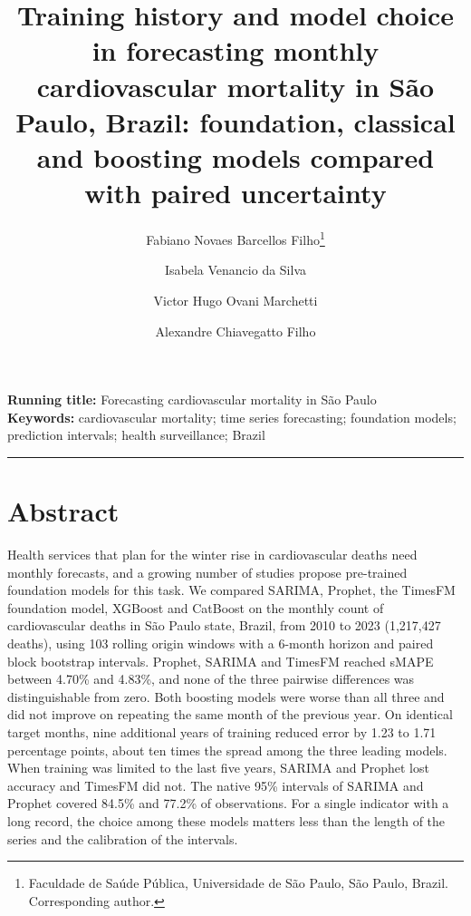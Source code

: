 

\title{\vspace{-2em}\large\bfseries Training history and model choice in forecasting monthly
cardiovascular mortality in S\~ao Paulo, Brazil: foundation, classical and boosting models
compared with paired uncertainty}

\ifdefined\BLIND
\author{}
\else
\author{Fabiano Novaes Barcellos Filho\thanks{Faculdade de Sa\'ude P\'ublica, Universidade de
S\~ao Paulo, S\~ao Paulo, Brazil. Corresponding author.} \and
Isabela Venancio da Silva\footnotemark[1] \and
Victor Hugo Ovani Marchetti\footnotemark[1] \and
Alexandre Chiavegatto Filho\footnotemark[1]}
\fi

\date{}


\maketitle

\noindent\textbf{Running title:} Forecasting cardiovascular mortality in S\~ao Paulo \\
\textbf{Keywords:} cardiovascular mortality; time series forecasting; foundation models;
prediction intervals; health surveillance; Brazil

\vspace{1em}
\hrule
\vspace{1em}

\section*{Abstract}

Health services that plan for the winter rise in cardiovascular deaths need monthly
forecasts, and a growing number of studies propose pre-trained foundation models for this
task. We compared SARIMA, Prophet, the TimesFM foundation model, XGBoost and CatBoost on the
monthly count of cardiovascular deaths in S\~ao Paulo state, Brazil, from 2010 to 2023
(1{,}217{,}427 deaths), using 103 rolling origin windows with a 6-month horizon and paired
block bootstrap intervals. Prophet, SARIMA and TimesFM reached sMAPE between 4.70\% and
4.83\%, and none of the three pairwise differences was distinguishable from zero. Both
boosting models were worse than all three and did not improve on repeating the same month
of the previous year. On identical target months, nine additional years of training reduced
error by 1.23 to 1.71 percentage points, about ten times the spread among the three leading
models. When training was limited to the last five years, SARIMA and Prophet lost accuracy
and TimesFM did not. The native 95\% intervals of SARIMA and Prophet covered 84.5\% and
77.2\% of observations. For a single indicator with a long record, the choice among these
models matters less than the length of the series and the calibration of the intervals.

